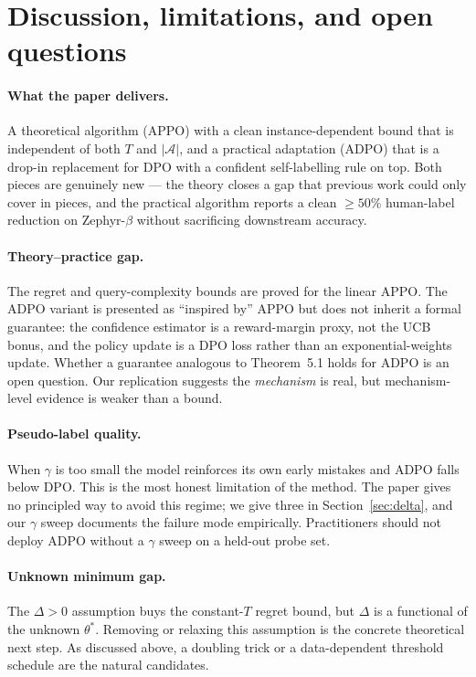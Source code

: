 \documentclass[11pt]{article}
\begin{document}
\section{Discussion, limitations, and open questions}

\paragraph{What the paper delivers.}
A theoretical algorithm (APPO) with a clean instance-dependent bound that is independent of both $T$ and $|\mathcal{A}|$, and a practical adaptation (ADPO) that is a drop-in replacement for DPO with a confident self-labelling rule on top. Both pieces are genuinely new --- the theory closes a gap that previous work could only cover in pieces, and the practical algorithm reports a clean $\geq 50\%$ human-label reduction on Zephyr-$\beta$ without sacrificing downstream accuracy.

\paragraph{Theory--practice gap.}
The regret and query-complexity bounds are proved for the linear APPO. The ADPO variant is presented as ``inspired by'' APPO but does not inherit a formal guarantee: the confidence estimator is a reward-margin proxy, not the UCB bonus, and the policy update is a DPO loss rather than an exponential-weights update. Whether a guarantee analogous to Theorem~5.1 holds for ADPO is an open question. Our replication suggests the \emph{mechanism} is real, but mechanism-level evidence is weaker than a bound.

\paragraph{Pseudo-label quality.}
When $\gamma$ is too small the model reinforces its own early mistakes and ADPO falls below DPO. This is the most honest limitation of the method. The paper gives no principled way to avoid this regime; we give three in Section~\ref{sec:delta}, and our $\gamma$ sweep documents the failure mode empirically. Practitioners should not deploy ADPO without a $\gamma$ sweep on a held-out probe set.

\paragraph{Unknown minimum gap.}
The $\Delta > 0$ assumption buys the constant-$T$ regret bound, but $\Delta$ is a functional of the unknown $\theta^*$. Removing or relaxing this assumption is the concrete theoretical next step. As discussed above, a doubling trick or a data-dependent threshold schedule are the natural candidates.
\end{document}
